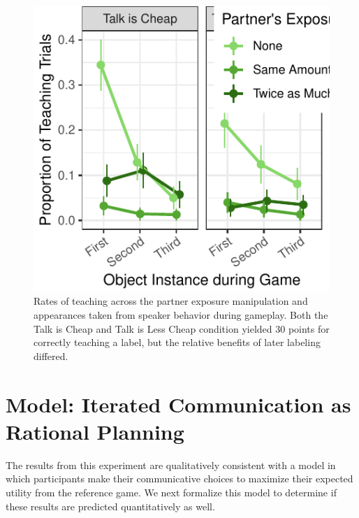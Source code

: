 \documentclass[10pt, letterpaper]{article}
\newenvironment{CodeChunk}{}{}
\begin{document}
\begin{CodeChunk}
\begin{figure}[H]

{\centering \includegraphics{figs/imp_teach-1} 

}

\caption[Rates of teaching across the partner exposure manipulation and appearances taken from speaker behavior during gameplay]{Rates of teaching across the partner exposure manipulation and appearances taken from speaker behavior during gameplay. Both the Talk is Cheap and Talk is Less Cheap condition yielded 30 points for correctly teaching a label, but the relative benefits of later labeling differed.}\label{fig:imp_teach}
\end{figure}
\end{CodeChunk}

\section{Model: Iterated Communication as Rational
Planning}\label{model-iterated-communication-as-rational-planning}

The results from this experiment are qualitatively consistent with a
model in which participants make their communicative choices to maximize
their expected utility from the reference game. We next formalize this
model to determine if these results are predicted quantitatively as
well.

\newcommand{\E}[1]{\mathbb{E}\left[ #1 \right]}
\end{document}

